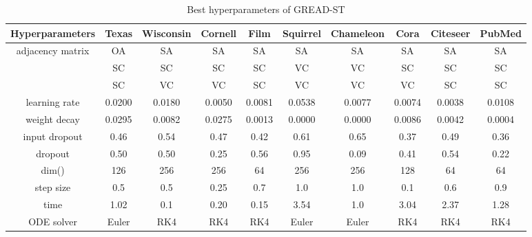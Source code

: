 \documentclass{article}
\theoremstyle{plain}
\theoremstyle{definition}
\theoremstyle{remark}
\begin{document}
\begin{table*}[ht!]
    \centering
    \small
    \caption{Best hyperparameters of GREAD-ST}
    \label{tab:best_ST}
    \begin{tabular}{c ccccccccc} \toprule
        Hyperparameters  & Texas  & Wisconsin 
                                          & Cornell& Film   & Squirrel 
                                                                      & Chameleon
                                                                               & Cora   & Citeseer 
                                                                                                 & PubMed\\ \midrule
        adjacency matrix & OA     & SA     & SA     & SA     & SA     & SA     & SA     & SA     & SA    \\
                 & SC     & SC     & SC     & SC     & VC     & VC     & SC     & SC     & SC    \\
                  & SC     & VC     & VC     & SC     & VC     & VC     & VC     & SC     & SC    \\
        learning rate    & 0.0200 & 0.0180 & 0.0050 & 0.0081 & 0.0538 & 0.0077 & 0.0074 & 0.0038 & 0.0108\\
        weight decay     & 0.0295 & 0.0082 & 0.0275 & 0.0013 & 0.0000 & 0.0000 & 0.0086 & 0.0042 & 0.0004\\
        input dropout    & 0.46   & 0.54   & 0.47   & 0.42   & 0.61   & 0.65   & 0.37   & 0.49   & 0.36  \\
        dropout          & 0.50   & 0.50   & 0.25   & 0.56   & 0.95   & 0.09   & 0.41   & 0.54   & 0.22  \\
        dim()& 126    & 256    & 256    & 64     & 256    & 256    & 128    & 64     & 64    \\
        step size  & 0.5    & 0.5    & 0.25   & 0.7    & 1.0    & 1.0    & 0.1    & 0.6    & 0.9   \\
        time          & 1.02   & 0.1    & 0.20   & 0.15   & 3.54   & 1.0    & 3.04   & 2.37   & 1.28  \\
        ODE solver       & Euler  & RK4    & RK4    & RK4    & Euler  & Euler  & RK4    & RK4    & RK4   \\
        \bottomrule
    \end{tabular}
\end{table*}
\end{document}
